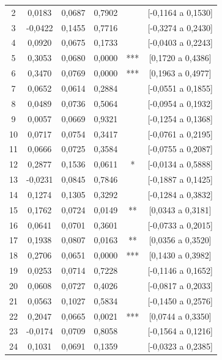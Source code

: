 \documentclass[12pt, a4paper]{article}
\begin{document}
\begin{longtable}{cccccc}
2   & 0,0183  & 0,0687 & 0,7902 &     & [-0,1164 a 0,1530] \\
3   & -0,0422 & 0,1455 & 0,7716 &     & [-0,3274 a 0,2430] \\
4   & 0,0920  & 0,0675 & 0,1733 &     & [-0,0403 a 0,2243] \\
5   & 0,3053  & 0,0680 & 0,0000 & *** & [0,1720 a 0,4386] \\
6   & 0,3470  & 0,0769 & 0,0000 & *** & [0,1963 a 0,4977] \\
7   & 0,0652  & 0,0614 & 0,2884 &     & [-0,0551 a 0,1855] \\
8   & 0,0489  & 0,0736 & 0,5064 &     & [-0,0954 a 0,1932] \\
9   & 0,0057  & 0,0669 & 0,9321 &     & [-0,1254 a 0,1368] \\
10  & 0,0717  & 0,0754 & 0,3417 &     & [-0,0761 a 0,2195] \\
11  & 0,0666  & 0,0725 & 0,3584 &     & [-0,0755 a 0,2087] \\
12  & 0,2877  & 0,1536 & 0,0611 & * & [-0,0134 a 0,5888] \\
13  & -0,0231 & 0,0845 & 0,7846 &     & [-0,1887 a 0,1425] \\
14  & 0,1274  & 0,1305 & 0,3292 &     & [-0,1284 a 0,3832] \\
15  & 0,1762  & 0,0724 & 0,0149 & ** & [0,0343 a 0,3181] \\
16  & 0,0641  & 0,0701 & 0,3601 &     & [-0,0733 a 0,2015] \\
17  & 0,1938  & 0,0807 & 0,0163 & ** & [0,0356 a 0,3520] \\
18  & 0,2706  & 0,0651 & 0,0000 & *** & [0,1430 a 0,3982] \\
19  & 0,0253  & 0,0714 & 0,7228 &     & [-0,1146 a 0,1652] \\
20  & 0,0608  & 0,0727 & 0,4026 &     & [-0,0817 a 0,2033] \\
21  & 0,0563  & 0,1027 & 0,5834 &     & [-0,1450 a 0,2576] \\
22  & 0,2047  & 0,0665 & 0,0021 & *** & [0,0744 a 0,3350] \\
23  & -0,0174 & 0,0709 & 0,8058 &     & [-0,1564 a 0,1216] \\
24  & 0,1031  & 0,0691 & 0,1359 &     & [-0,0323 a 0,2385] \\
\end{longtable}
\end{document}
